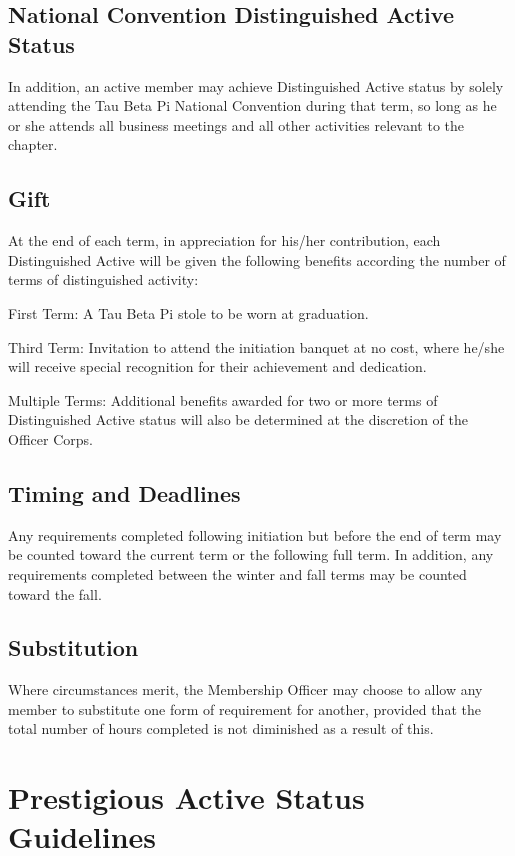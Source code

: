 \section{National Convention Distinguished Active Status} In addition, an active member may achieve Distinguished Active status by solely attending the Tau Beta Pi National Convention during that term, so long as he or she attends all business meetings and all other activities relevant to the chapter.
\section{Gift} At the end of each term, in appreciation for his/her contribution, each Distinguished Active will be given the following benefits according the number of terms of distinguished activity:
\begin{enumsubsection}
\item{First Term:} A Tau Beta Pi stole to be worn at graduation.
\item{Third Term:}  Invitation to attend the initiation banquet at no cost, where he/she will receive special recognition for their achievement and dedication. 
\item{Multiple Terms:} Additional benefits awarded for two or more  terms of Distinguished Active status will also be determined at the discretion of the Officer Corps. 
\end{enumsubsection}
\section{Timing and Deadlines} Any requirements completed following initiation but before the end of term may be counted toward the current term or the following full term. In addition, any requirements completed between the winter and fall terms may be counted toward the fall. 
\section{Substitution} Where circumstances merit, the Membership Officer may choose to allow any member to substitute one form of requirement for another, provided that the total number of hours completed is not diminished as a result of this.

\chapter{Prestigious Active Status Guidelines}\label{sec:PAstatus}
